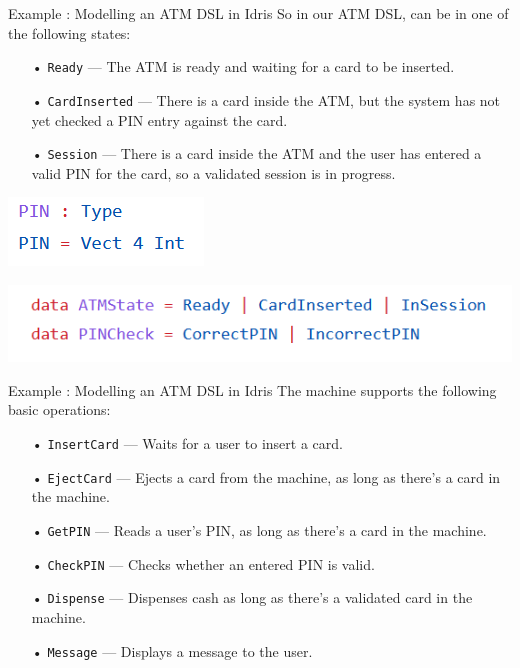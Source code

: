 \documentclass{beamer}
\newcommand{\dsltitle}{Example : Modelling an ATM DSL in Idris}
\begin{document}
\begin{frame}[fragile]{\dsltitle}
So in our ATM DSL, can be in one of the following states:
\begin{enumerate}
\item[•] \texttt{Ready} — The ATM is ready and waiting for a card to be inserted.
\item[•] \texttt{CardInserted} — There is a card inside the ATM, but the system has not yet checked a PIN entry against the card.
\item[•] \texttt{Session} — There is a card inside the ATM and the user has entered a valid PIN for the card, so a validated session is in progress.
\end{enumerate}
\begin{center}
	\includegraphics[scale=0.7]{pics/dsl-code-0}
\end{center}
\begin{center}
	\includegraphics[scale=0.7]{pics/dsl-code-1}
\end{center}
\end{frame}

\begin{frame}[fragile]{\dsltitle}
The machine supports the following basic operations:
\begin{enumerate}
\item[•] \texttt{InsertCard} — Waits for a user to insert a card.
\item[•] \texttt{EjectCard} — Ejects a card from the machine, as long as there’s a card in the machine.
\item[•] \texttt{GetPIN} — Reads a user’s PIN, as long as there’s a card in the machine.
\item[•] \texttt{CheckPIN} — Checks whether an entered PIN is valid.
\item[•] \texttt{Dispense} — Dispenses cash as long as there’s a validated card in the machine.
\item[•] \texttt{Message} — Displays a message to the user.
\end{enumerate}
\end{frame}
\end{document}

